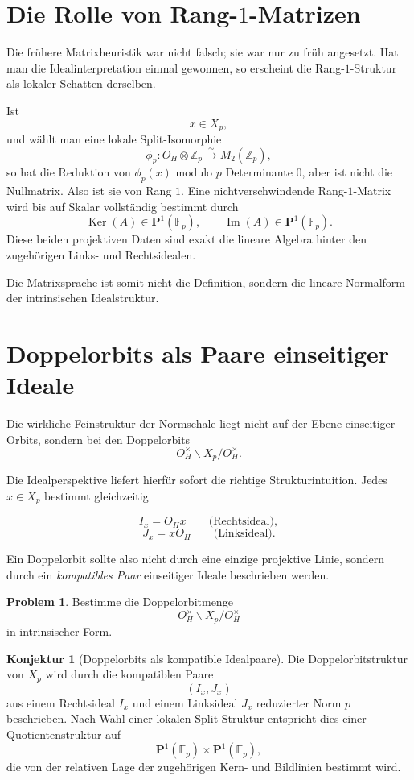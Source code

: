 \documentclass[12pt,a4paper]{article}
\theoremstyle{definition}
\newtheorem{problem}[satz]{Problem}
\newtheorem{konjektur}[satz]{Konjektur}
\newcommand{\OH}{O_H}
\newcommand{\Z}{\mathbb{Z}}
\newcommand{\Fp}{\mathbb{F}_p}
\newcommand{\Ker}{\operatorname{Ker}}
\newcommand{\Image}{\operatorname{Im}}
\begin{document}
	\section{Die Rolle von Rang-\(1\)-Matrizen}
	
	Die frühere Matrixheuristik war nicht falsch; sie war nur zu früh angesetzt. Hat man die Idealinterpretation einmal gewonnen, so erscheint die Rang-\(1\)-Struktur als lokaler Schatten derselben.
	
	Ist
	\[
	x\in X_p,
	\]
	und wählt man eine lokale Split-Isomorphie
	\[
	\phi_p:\OH\otimes \Z_p \xrightarrow{\sim} M_2(\Z_p),
	\]
	so hat die Reduktion von \(\phi_p(x)\) modulo \(p\) Determinante \(0\), aber ist nicht die Nullmatrix. Also ist sie von Rang \(1\). Eine nichtverschwindende Rang-\(1\)-Matrix wird bis auf Skalar vollständig bestimmt durch
	\[
	\Ker(A)\in \mathbf P^1(\Fp),\qquad \Image(A)\in \mathbf P^1(\Fp).
	\]
	Diese beiden projektiven Daten sind exakt die lineare Algebra hinter den zugehörigen Links- und Rechtsidealen.
	
	Die Matrixsprache ist somit nicht die Definition, sondern die lineare Normalform der intrinsischen Idealstruktur.
	
	\section{Doppelorbits als Paare einseitiger Ideale}
	
	Die wirkliche Feinstruktur der Normschale liegt nicht auf der Ebene einseitiger Orbits, sondern bei den Doppelorbits
	\[
	\OH^\times\backslash X_p/\OH^\times.
	\]
	
	Die Idealperspektive liefert hierfür sofort die richtige Strukturintuition. Jedes \(x\in X_p\) bestimmt gleichzeitig
	
	\[
	I_x=\OH x \qquad\text{(Rechtsideal)},
	\]
	\[
	J_x=x\OH \qquad\text{(Linksideal)}.
	\]
	
	Ein Doppelorbit sollte also nicht durch eine einzige projektive Linie, sondern durch ein \emph{kompatibles Paar} einseitiger Ideale beschrieben werden.
	
	\begin{problem}
		Bestimme die Doppelorbitmenge
		\[
		\OH^\times\backslash X_p/\OH^\times
		\]
		in intrinsischer Form.
	\end{problem}
	
	\begin{konjektur}[Doppelorbits als kompatible Idealpaare]
		Die Doppelorbitstruktur von \(X_p\) wird durch die kompatiblen Paare
		\[
		(I_x,J_x)
		\]
		aus einem Rechtsideal \(I_x\) und einem Linksideal \(J_x\) reduzierter Norm \(p\) beschrieben. Nach Wahl einer lokalen Split-Struktur entspricht dies einer Quotientenstruktur auf
		\[
		\mathbf P^1(\Fp)\times \mathbf P^1(\Fp),
		\]
		die von der relativen Lage der zugehörigen Kern- und Bildlinien bestimmt wird.
	\end{konjektur}
	
\end{document}
